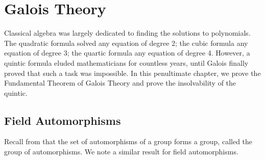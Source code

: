 \chapter{Galois Theory}
Classical algebra was largely dedicated to finding the solutions to polynomials. The quadratic formula solved any equation of degree 2; the cubic formula any equation of degree 3; the quartic formula any equation of degree 4. However, a quintic formula eluded mathematicians for countless years, until Galois finally proved that such a task was impossible. In this penultimate chapter, we prove the Fundamental Theorem of Galois Theory and prove the insolvability of the quintic.

\section{Field Automorphisms}
Recall from  that the set of automorphisms of a group forms a group, called the group of automorphisms. We note a similar result for field automorphisms.

